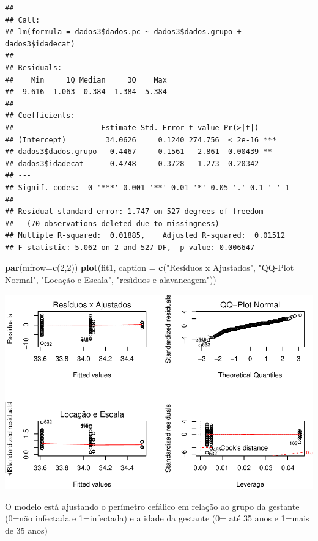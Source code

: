 \documentclass[11pt,]{article}
\makeatletter
\newenvironment{Shaded}{\begin{snugshade}}{\end{snugshade}}
\newcommand{\KeywordTok}[1]{\textcolor[rgb]{0.13,0.29,0.53}{\textbf{{#1}}}}
\newcommand{\DataTypeTok}[1]{\textcolor[rgb]{0.13,0.29,0.53}{{#1}}}
\newcommand{\DecValTok}[1]{\textcolor[rgb]{0.00,0.00,0.81}{{#1}}}
\newcommand{\StringTok}[1]{\textcolor[rgb]{0.31,0.60,0.02}{{#1}}}
\newcommand{\NormalTok}[1]{{#1}}
\def\maxwidth{\ifdim\Gin@nat@width>\linewidth\linewidth
\else\Gin@nat@width\fi}
\let\Oldincludegraphics\includegraphics
\renewcommand{\includegraphics}[1]{\Oldincludegraphics[width=\maxwidth]{#1}}
\makeatother
\begin{document}
\begin{verbatim}
## 
## Call:
## lm(formula = dados3$dados.pc ~ dados3$dados.grupo + dados3$idadecat)
## 
## Residuals:
##    Min     1Q Median     3Q    Max 
## -9.616 -1.063  0.384  1.384  5.384 
## 
## Coefficients:
##                    Estimate Std. Error t value Pr(>|t|)    
## (Intercept)         34.0626     0.1240 274.756  < 2e-16 ***
## dados3$dados.grupo  -0.4467     0.1561  -2.861  0.00439 ** 
## dados3$idadecat      0.4748     0.3728   1.273  0.20342    
## ---
## Signif. codes:  0 '***' 0.001 '**' 0.01 '*' 0.05 '.' 0.1 ' ' 1
## 
## Residual standard error: 1.747 on 527 degrees of freedom
##   (70 observations deleted due to missingness)
## Multiple R-squared:  0.01885,    Adjusted R-squared:  0.01512 
## F-statistic: 5.062 on 2 and 527 DF,  p-value: 0.006647
\end{verbatim}

\begin{Shaded}
\begin{Highlighting}[]
\KeywordTok{par}\NormalTok{(}\DataTypeTok{mfrow=}\KeywordTok{c}\NormalTok{(}\DecValTok{2}\NormalTok{,}\DecValTok{2}\NormalTok{))}
\KeywordTok{plot}\NormalTok{(fit1, }\DataTypeTok{caption =} \KeywordTok{c}\NormalTok{(}\StringTok{"Resíduos x Ajustados"}\NormalTok{, }\StringTok{"QQ-Plot Normal"}\NormalTok{,}
                       \StringTok{"Locação e Escala"}\NormalTok{, }\StringTok{"resìduos e alavancagem"}\NormalTok{))}
\end{Highlighting}
\end{Shaded}

\includegraphics{versaofinal_lista3_files/figure-latex/unnamed-chunk-15-1.pdf}

O modelo está ajustando o perímetro cefálico em relação ao grupo da
gestante (0=não infectada e 1=infectada) e a idade da gestante (0= até
35 anos e 1=mais de 35 anos)
\end{document}
